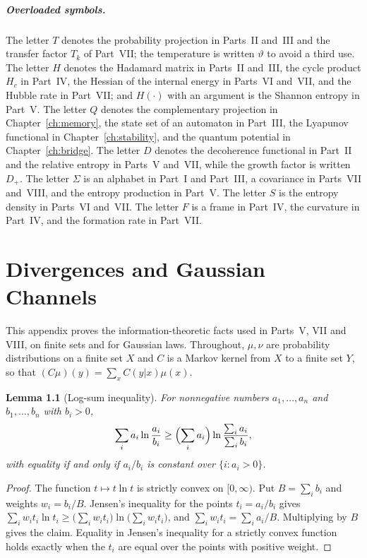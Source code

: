 \documentclass[11pt,oneside]{book}
\newtheorem{lemma}[theorem]{Lemma}
\theoremstyle{definition}
\theoremstyle{remark}
\begin{document}
\paragraph{Overloaded symbols.} The letter $T$ denotes the probability projection in Parts~II and~III and the transfer factor $T_k$ of Part~VII; the temperature is written $\vartheta$ to avoid a third use. The letter $H$ denotes the Hadamard matrix in Parts~II and~III, the cycle product $H_c$ in Part~IV, the Hessian of the internal energy in Parts~VI and~VII, and the Hubble rate in Part~VII; and $H(\cdot)$ with an argument is the Shannon entropy in Part~V. The letter $Q$ denotes the complementary projection in Chapter~\ref{ch:memory}, the state set of an automaton in Part~III, the Lyapunov functional in Chapter~\ref{ch:stability}, and the quantum potential in Chapter~\ref{ch:bridge}. The letter $D$ denotes the decoherence functional in Part~II and the relative entropy in Parts~V and~VII, while the growth factor is written $D_+$. The letter $\Sigma$ is an alphabet in Part~I and Part~III, a covariance in Parts~VII and~VIII, and the entropy production in Part~V. The letter $S$ is the entropy density in Parts~VI and~VII. The letter $F$ is a frame in Part~IV, the curvature in Part~IV, and the formation rate in Part~VII.

\chapter{Divergences and Gaussian Channels}\label{app:divergences}

This appendix proves the information-theoretic facts used in Parts~V, VII and VIII, on finite sets and for Gaussian laws. Throughout, $\mu,\nu$ are probability distributions on a finite set $X$ and $C$ is a Markov kernel from $X$ to a finite set $Y$, so that $(C\mu)(y)=\sum_xC(y|x)\mu(x)$.

\begin{lemma}[Log-sum inequality]\label{lem:logsum}
For nonnegative numbers $a_1,\dots,a_n$ and $b_1,\dots,b_n$ with $b_i>0$,
\[
\sum_ia_i\ln\frac{a_i}{b_i}\geq\Bigl(\sum_ia_i\Bigr)\ln\frac{\sum_ia_i}{\sum_ib_i},
\]
with equality if and only if $a_i/b_i$ is constant over $\{i:a_i>0\}$.
\end{lemma}

\begin{proof}
The function $t\mapsto t\ln t$ is strictly convex on $[0,\infty)$. Put $B=\sum_ib_i$ and weights $w_i=b_i/B$. Jensen's inequality for the points $t_i=a_i/b_i$ gives $\sum_iw_it_i\ln t_i\geq\bigl(\sum_iw_it_i\bigr)\ln\bigl(\sum_iw_it_i\bigr)$, and $\sum_iw_it_i=\sum_ia_i/B$. Multiplying by $B$ gives the claim. Equality in Jensen's inequality for a strictly convex function holds exactly when the $t_i$ are equal over the points with positive weight.
\end{proof}
\end{document}
